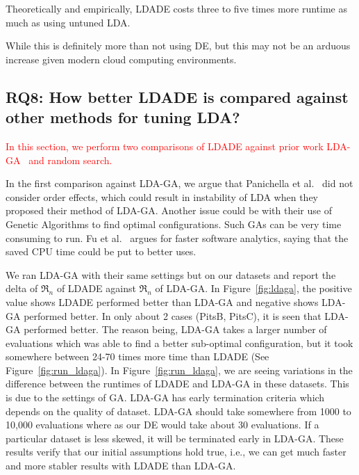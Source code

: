 \documentclass[twocolumn,5p,sort&compress]{elsarticle}
\theoremstyle{break}
\begin{document}
  
  \begin{lesson}
    Theoretically and empirically, LDADE costs three to five times more runtime
    as much as using untuned LDA.
  \end{lesson}

  While this is definitely more than not using DE, but this may not be an arduous increase
  given modern cloud computing environments.

\subsection{\textbf{RQ8: How better LDADE is compared against other methods for tuning LDA?}}
\label{sect:rq8}

\textcolor{red}{In this section,
we perform two comparisons of LDADE  against    prior work LDA-GA~\cite{panichella2013effectively} and random search.}

In the first comparison against LDA-GA, we argue that Panichella et al.~\cite{panichella2013effectively} did not consider order effects, which could result in instability of LDA when they proposed their method of LDA-GA. 
Another issue could be with their use of Genetic Algorithms to find optimal configurations. Such GAs can be very time consuming to run.
 Fu et al.~\cite{fu2017easy} argues for faster software analytics,
 saying that the saved CPU time
 could be put to better uses.

We ran LDA-GA with their same settings but on our datasets and report the delta of $\Re_n$ of LDADE against $\Re_n$ of LDA-GA. In Figure~\ref{fig:ldaga}, the positive value shows LDADE performed better than LDA-GA and negative shows LDA-GA performed better. In only about 2 cases (PitsB, PitsC), it is seen that LDA-GA performed better. The reason being, LDA-GA takes a larger number of evaluations which was able to find a better sub-optimal configuration, but it took somewhere between 24-70 times more time than LDADE (See Figure~\ref{fig:run_ldaga}). In Figure~\ref{fig:run_ldaga}, we are seeing variations in the difference between the runtimes of LDADE and LDA-GA in these datasets. This is due to the settings of GA. LDA-GA has early termination criteria which depends on the quality of dataset. LDA-GA should take somewhere from 1000 to 10,000 evaluations where as our DE would take about 30 evaluations. If a particular dataset is less skewed, it will be terminated early in LDA-GA. These results verify that our initial assumptions hold true, i.e., we can get much faster and more stabler results with LDADE than LDA-GA.
\end{document}
